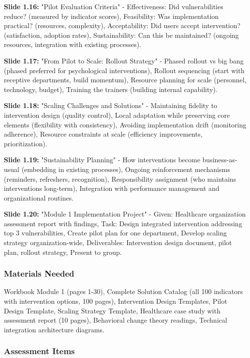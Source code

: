 \documentclass[11pt,a4paper]{article}
\begin{document}
\textbf{Slide 1.16:} "Pilot Evaluation Criteria" - Effectiveness: Did vulnerabilities reduce? (measured by indicator scores), Feasibility: Was implementation practical? (resources, complexity), Acceptability: Did users accept intervention? (satisfaction, adoption rates), Sustainability: Can this be maintained? (ongoing resources, integration with existing processes).

\textbf{Slide 1.17:} "From Pilot to Scale: Rollout Strategy" - Phased rollout vs big bang (phased preferred for psychological interventions), Rollout sequencing (start with receptive departments, build momentum), Resource planning for scale (personnel, technology, budget), Training the trainers (building internal capability).

\textbf{Slide 1.18:} "Scaling Challenges and Solutions" - Maintaining fidelity to intervention design (quality control), Local adaptation while preserving core elements (flexibility with consistency), Avoiding implementation drift (monitoring adherence), Resource constraints at scale (efficiency improvements, prioritization).

\textbf{Slide 1.19:} "Sustainability Planning" - How interventions become business-as-usual (embedding in existing processes), Ongoing reinforcement mechanisms (reminders, refreshers, recognition), Responsibility assignment (who maintains interventions long-term), Integration with performance management and organizational routines.

\textbf{Slide 1.20:} "Module 1 Implementation Project" - Given: Healthcare organization assessment report with findings, Task: Design integrated intervention addressing top 3 vulnerabilities, Create pilot plan for one department, Develop scaling strategy organization-wide, Deliverables: Intervention design document, pilot plan, rollout strategy, Present to group.

\subsubsection{Materials Needed}

Workbook Module 1 (pages 1-30), Complete Solution Catalog (all 100 indicators with intervention options, 100 pages), Intervention Design Templates, Pilot Design Template, Scaling Strategy Template, Healthcare case study with assessment report (10 pages), Behavioral change theory readings, Technical integration architecture diagrams.

\subsubsection{Assessment Items}
\end{document}
